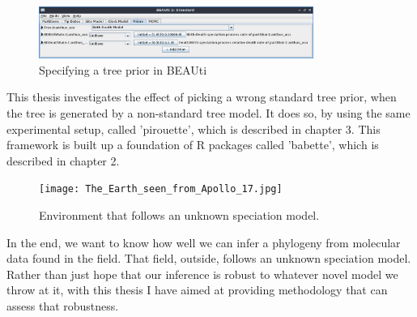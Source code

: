 \begin{figure}[H]
  \includegraphics[width=0.8\textwidth]{beauti_tree_prior.png}
  \caption{
    Specifying a tree prior in BEAUti
 }
  \label{fig:beauti_tree_prior}
\end{figure}

This thesis investigates the effect of picking a wrong standard
tree prior, when the tree is generated 
by a non-standard tree model. 
It does so, by using the same experimental setup, called 'pirouette',
which is described in chapter 3. This framework is built up a foundation
of R packages called 'babette', which is described in chapter 2.

\begin{figure}[H]
  \texttt{[image: The\_Earth\_seen\_from\_Apollo\_17.jpg]}
  \caption{
    Environment that follows an unknown speciation model.
 }
  \label{fig:unknown_speciation_model}
\end{figure}

In the end, we want to know how well we can infer a phylogeny from
molecular data found in the field. That field, outside, 
follows an unknown speciation model. Rather than just hope that our inference
is robust to whatever novel model we throw at it, with this thesis I have aimed at providing methodology that can assess that robustness.




